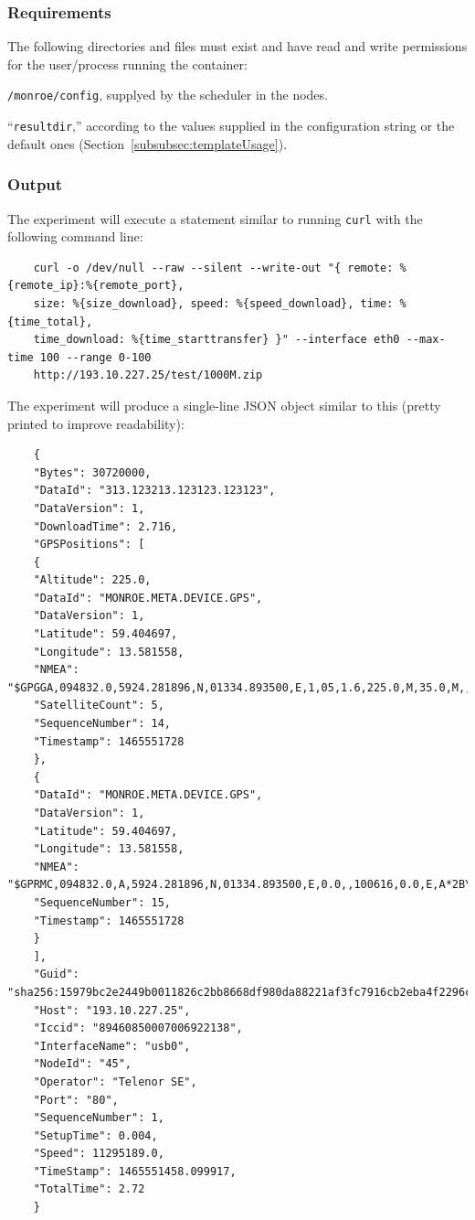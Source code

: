 \documentclass[a4paper,10pt]{article}
\newcommand{\VerbatimFont}{\footnotesize}
\newcommand{\identifier}[1]{{\texttt{\small{#1}}}}
\begin{document}
\subsubsection{Requirements}

The following directories and files must exist and have read and write permissions for the user/process running the container:

\begin{itemize*}
	\item \identifier{/monroe/config}, supplyed by the scheduler in the nodes.
	\item ``\identifier{resultdir},'' according to the values supplied in the configuration string or the default ones (Section~\ref{subsubsec:templateUsage}).
\end{itemize*}

\subsubsection{Output}

The experiment will execute a statement similar to running \identifier{curl} with the following command line:

{\VerbatimFont
	\begin{verbatim}
	curl -o /dev/null --raw --silent --write-out "{ remote: %{remote_ip}:%{remote_port},
	size: %{size_download}, speed: %{speed_download}, time: %{time_total},
	time_download: %{time_starttransfer} }" --interface eth0 --max-time 100 --range 0-100
	http://193.10.227.25/test/1000M.zip
	\end{verbatim}}

The experiment will produce a single-line JSON object similar to this (pretty printed to improve readability):

{\VerbatimFont
	\begin{verbatim}
	{
	"Bytes": 30720000,
	"DataId": "313.123213.123123.123123",
	"DataVersion": 1,
	"DownloadTime": 2.716,
	"GPSPositions": [
	{
	"Altitude": 225.0,
	"DataId": "MONROE.META.DEVICE.GPS",
	"DataVersion": 1,
	"Latitude": 59.404697,
	"Longitude": 13.581558,
	"NMEA": "$GPGGA,094832.0,5924.281896,N,01334.893500,E,1,05,1.6,225.0,M,35.0,M,,*5D\r\n",
	"SatelliteCount": 5,
	"SequenceNumber": 14,
	"Timestamp": 1465551728
	},
	{
	"DataId": "MONROE.META.DEVICE.GPS",
	"DataVersion": 1,
	"Latitude": 59.404697,
	"Longitude": 13.581558,
	"NMEA": "$GPRMC,094832.0,A,5924.281896,N,01334.893500,E,0.0,,100616,0.0,E,A*2B\r\n",
	"SequenceNumber": 15,
	"Timestamp": 1465551728
	}
	],
	"Guid": "sha256:15979bc2e2449b0011826c2bb8668df980da88221af3fc7916cb2eba4f2296c1.0.45.15",
	"Host": "193.10.227.25",
	"Iccid": "89460850007006922138",
	"InterfaceName": "usb0",
	"NodeId": "45",
	"Operator": "Telenor SE",
	"Port": "80",
	"SequenceNumber": 1,
	"SetupTime": 0.004,
	"Speed": 11295189.0,
	"TimeStamp": 1465551458.099917,
	"TotalTime": 2.72
	}
	\end{verbatim}}
\end{document}
